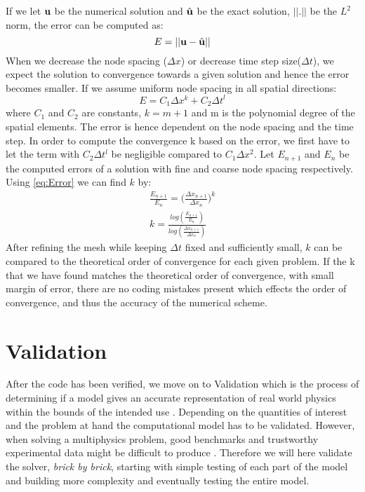If we let $\bold{u}$ be the numerical solution and $\hat{\bold{u}}$ be the exact solution, $|| . ||$ be the $L^2$ norm, the error can be computed as:
\begin{equation}
E = || \bold{u} - \hat{\bold{u}} ||
\end{equation}
When we decrease the node spacing ($ \Delta x $) or decrease time step size($\Delta t$), we expect the solution to convergence towards a given solution and hence the error becomes smaller. If we assume uniform node spacing in all spatial directions: 
\begin{equation}
\label{eq:Error}
 E = C_1 \Delta x^k+ C_2 \Delta t^l 
\end{equation}
where $C_1$ and $C_2$ are constants, $ k = m+1 $ and m is the polynomial degree of the spatial elements. The error is hence dependent on the node spacing and the time step.
In order to compute the convergence k  based on the error, we first have to let the term with $C_2\Delta t^l$ be negligible compared to $C_1\Delta x^2$. 
Let $E_{n+1}$ and $E_{n}$ be the computed errors of a solution with fine and coarse node spacing respectively.
Using \eqref{eq:Error} we can find $k$ by:
\begin{align}
\frac{E_{n+1}}{E_n} = \big( \frac{\Delta x_{n+1}}{\Delta x_n} \big)^k \\
k = \frac{log( \frac{E_{n+1}}{E_n}) }{ log(\frac{\Delta x_{n+1}}{\Delta x_n})}
\end{align}
After refining the mesh while keeping $\Delta t $ fixed and sufficiently small,
$k$ can be compared to the theoretical order of convergence for each given problem. If the k that we have found matches the theoretical order of convergence, with small margin of error, there are no coding mistakes present which effects the order of convergence, and thus the accuracy of the numerical scheme. \newline




\section{Validation}
After the code has been verified, we move on to Validation which is the process of determining if a model gives an accurate representation of real world physics within the bounds of the intended use \cite{oberkampf2008verification}. Depending on the quantities of interest and the problem at hand the computational model has to be validated. However, when solving a multiphysics problem, good benchmarks and trustworthy experimental data might be difficult to produce \cite{Macal2005}. Therefore we will here validate the solver, \textsl{brick by brick}, starting with simple testing of each part of the model and building more complexity and eventually testing the entire model.\newline

